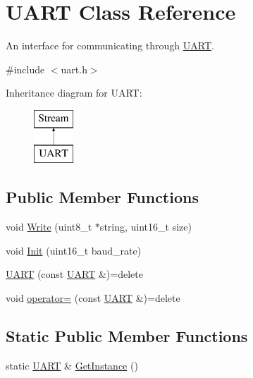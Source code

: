 \hypertarget{class_u_a_r_t}{}\section{U\+A\+RT Class Reference}
\label{class_u_a_r_t}


An interface for communicating through \hyperlink{class_u_a_r_t}{U\+A\+RT}.  




{\ttfamily \#include $<$uart.\+h$>$}

Inheritance diagram for U\+A\+RT\+:\begin{figure}[H]
\begin{center}
\leavevmode
\includegraphics[height=2.000000cm]{class_u_a_r_t}
\end{center}
\end{figure}
\subsection*{Public Member Functions}
\begin{DoxyCompactItemize}
\item 
void \hyperlink{class_u_a_r_t_a8bb77ca27b4e17d608d2743313625ac4}{Write} (uint8\+\_\+t $\ast$string, uint16\+\_\+t size)
\item 
void \hyperlink{class_u_a_r_t_aed659ee8bc31ba966144d1a522506a7b}{Init} (uint16\+\_\+t baud\+\_\+rate)
\item 
\hyperlink{class_u_a_r_t_a97debffc29b178c09b104f4542298a36}{U\+A\+RT} (const \hyperlink{class_u_a_r_t}{U\+A\+RT} \&)=delete
\item 
void \hyperlink{class_u_a_r_t_a843ab7fc20f5ce5f030d2ca5ee98d6b6}{operator=} (const \hyperlink{class_u_a_r_t}{U\+A\+RT} \&)=delete
\end{DoxyCompactItemize}
\subsection*{Static Public Member Functions}
\begin{DoxyCompactItemize}
\item 
static \hyperlink{class_u_a_r_t}{U\+A\+RT} \& \hyperlink{class_u_a_r_t_a745c8f35f3ca3ab6359cedda3e640777}{Get\+Instance} ()
\end{DoxyCompactItemize}
